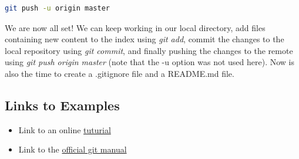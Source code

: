 \begin{lstlisting}[language=bash, caption=Push the local repository to the remote ]
git push -u origin master
\end{lstlisting}

We are now all set! We can keep working in our local directory, add files containing new content to the index using \textit{git add}, commit the changes to the local repository using \textit{git commit}, and finally pushing the changes to the remote using \textit{git push origin master} (note that the -u option was not used here). Now is also the time to create a .gitignore file and a README.md file.

\subsection{Links to Examples}

\begin{itemize}
\item Link to an online \href{https://try.github.io/levels/1/challenges/1}{tuturial}
\item Link to the \href{https://git-scm.com/documentation}{official git manual}
\end{itemize}